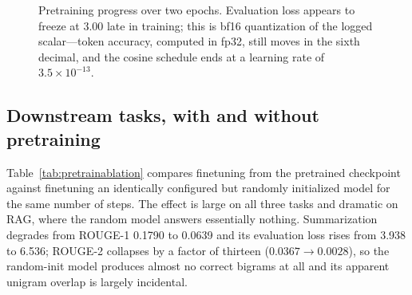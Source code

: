 \documentclass[11pt]{article}
\begin{document}
\begin{figure}[t]
\centering
{}
\caption{Pretraining progress over two epochs. Evaluation loss appears to freeze at 3.00 late
in training; this is bf16 quantization of the logged scalar---token accuracy, computed in
fp32, still moves in the sixth decimal, and the cosine schedule ends at a learning rate of
$3.5\times10^{-13}$.}
\label{fig:curves}
\end{figure}

\subsection{Downstream tasks, with and without pretraining}

Table~\ref{tab:pretrainablation} compares finetuning from the pretrained checkpoint against
finetuning an identically configured but randomly initialized model for the same number of
steps. The effect is large on all three tasks and dramatic on RAG, where the random model
answers essentially nothing. Summarization degrades from ROUGE-1 0.1790 to 0.0639 and its
evaluation loss rises from 3.938 to 6.536; ROUGE-2 collapses by a factor of thirteen
($0.0367 \rightarrow 0.0028$), so the random-init model produces almost no correct bigrams
at all and its apparent unigram overlap is largely incidental.
\end{document}
